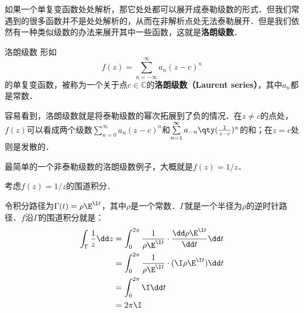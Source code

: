 

如果一个单复变函数处处解析，那它处处都可以展开成泰勒级数的形式．但我们常遇到的很多函数并不是处处解析的，从而在非解析点处无法泰勒展开．但是我们依然有一种类似级数的办法来展开其中一些函数，这就是\textbf{洛朗级数}．

\begin{definition}{洛朗级数}
形如
\begin{equation}
f(z)=\sum\limits_{n=-\infty}^{\infty} a_n(z-c)^n
\end{equation}
的单复变函数，被称为一个关于点$c\in\mathbb{C}$的\textbf{洛朗级数（Laurent series）}，其中$a_n$都是常数．


\end{definition}

容易看到，洛朗级数就是将泰勒级数的幂次拓展到了负的情况．在$z\neq c$的点处，$f(z)$可以看成两个级数$\sum\limits_{n=0}^{\infty} a_n(z-c)^n$和$\sum\limits_{n=1}^{\infty} a_{-n}\qty(\frac{1}{z-c})^n$的和；在$z=c$处则是发散的．

最简单的一个非泰勒级数的洛朗级数例子，大概就是$f(z)=1/z$．

\begin{example}{}
考虑$f(z)=1/z$的围道积分．

令积分路径为$\Gamma(t)=\rho\E^{\I t}$，其中$\rho$是一个常数．$\Gamma$就是一个半径为$\rho$的逆时针路径．$f$沿$\Gamma$的围道积分就是：
\begin{equation}
\begin{aligned}
\int_{\Gamma}\frac{1}{z}\dd z&=\int^{2\pi}_0\frac{1}{\rho\E^{\I t}}\cdot\frac{\dd\rho\E^{\I t}}{\dd t}\dd t\\
&=\int_0^{2\pi}\frac{1}{\rho\E^{\I t}}\cdot (\I \rho \E^{\I t})\dd t\\
&=\int_0^{2\pi}\I\dd t\\
&=2\pi\I
\end{aligned}
\end{equation}
\end{example}

















